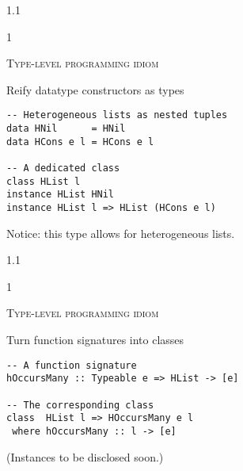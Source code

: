 \documentclass{slides}
\newcommand{\header}[1]{{\large\scshape \color{Red} #1} \medskip }
\newcommand{\blau}[1]{{\color{Blue} #1} \medskip }
\newenvironment{myslide}{\begin{slide}\color{Blue}\begin{boxedminipage}{1.1\hsize}\begin{boxedminipage}{1\hsize}\color{Black}
\vspace{-170\in}
}{%
\smallskip
\end{boxedminipage}
\end{boxedminipage}
\end{slide}}
\begin{document}



\begin{myslide}

\header{Type-level programming idiom}

\blau{Reify datatype constructors as types}

\begin{Verbatim}[fontseries=normal,fontsize=\tiny]
-- Heterogeneous lists as nested tuples
data HNil      = HNil
data HCons e l = HCons e l

-- A dedicated class
class HList l
instance HList HNil
instance HList l => HList (HCons e l)
\end{Verbatim}

\medskip

{\small

Notice: this type allows for heterogeneous lists.

}

\end{myslide}






\begin{myslide}

\header{Type-level programming idiom}

\blau{Turn function signatures into classes}

\begin{Verbatim}[fontseries=normal,fontsize=\tiny]
-- A function signature
hOccursMany :: Typeable e => HList -> [e]

-- The corresponding class
class  HList l => HOccursMany e l
 where hOccursMany :: l -> [e]
\end{Verbatim}

\medskip

{\small

(Instances to be disclosed soon.)

}

\end{myslide}



\end{document}
